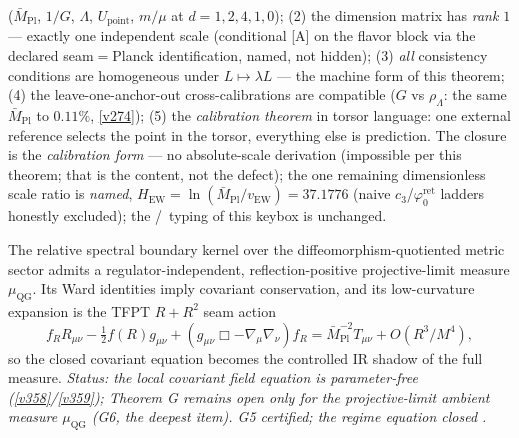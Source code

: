 \documentclass[11pt,a4paper]{article}
\newcommand{\phiz}{\varphi_0^{\mathrm{ret}}}
\newcommand{\cthree}{c_3}
\newcommand{\Mpl}{\bar M_{\mathrm{Pl}}}
\begin{document}
\begin{keybox}
($\Mpl$, $1/G$, $\Lambda$, $U_{\mathrm{point}}$, $m/\mu$ at
$d=1,2,4,1,0$); (2) the dimension matrix has \emph{rank $1$} ---
exactly one independent scale (conditional [A] on the flavor block
via the declared seam$=$Planck identification, named, not hidden);
(3) \emph{all} consistency conditions are homogeneous under
$L\mapsto\lambda L$ --- the machine form of this theorem; (4) the
leave-one-anchor-out cross-calibrations are compatible ($G$ vs
$\rho_\Lambda$: the same $\Mpl$ to $0.11\%$, \vref{v274}); (5) the
\emph{calibration theorem} in torsor language: one external
reference selects the point in the torsor, everything else is
prediction.  The closure is the \emph{calibration form} --- no
absolute-scale derivation (impossible per this theorem; that is the
content, not the defect); the one remaining dimensionless scale
ratio is \emph{named}, $H_{\mathrm{EW}}=\ln(\Mpl/v_{\mathrm{EW}})
=37.1776$ (naive $\cthree$/$\phiz$ ladders honestly excluded); the
\mE/\mO\ typing of this keybox is unchanged.
\end{keybox}

\begin{keybox}
The relative spectral boundary kernel over the diffeomorphism-quotiented metric sector admits a
regulator-independent, reflection-positive projective-limit measure $\mu_{\mathrm{QG}}$. Its Ward
identities imply covariant conservation, and its low-curvature expansion is the TFPT $R+R^2$ seam action
\[
  f_R R_{\mu\nu}-\tfrac12 f(R)g_{\mu\nu}+(g_{\mu\nu}\Box-\nabla_\mu\nabla_\nu)f_R
  =\Mpl^{-2}T_{\mu\nu}+O(R^3/M^4),
\]
so the closed covariant equation becomes the controlled IR shadow of the full measure. \emph{Status: the
local covariant field equation is parameter-free (\vref{v358}/\vref{v359}); Theorem G remains open only for
the projective-limit ambient \emph{measure} $\mu_{\mathrm{QG}}$ (G6, the deepest item). G5 certified; the
regime equation closed .}
\end{keybox}

\end{document}
